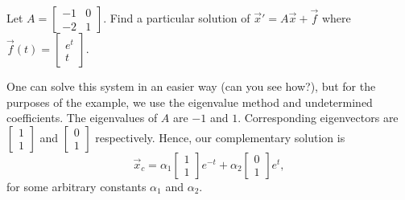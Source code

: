 \begin{example}
Let $A = \left[
\begin{smallmatrix}
-1 & 0 \\
-2 & 1
\end{smallmatrix} \right]$.
Find a particular solution of ${\vec{x}}' = A \vec{x} +
\vec{f}$ where $\vec{f}(t) = 
\left[ \begin{smallmatrix}
e^t \\
t
\end{smallmatrix} \right]$.

One can solve this system in an easier way (can you see how?), but
for the purposes of the example, we use the eigenvalue method and
undetermined coefficients.
The eigenvalues of $A$ are 
$-1$ and $1$.
Corresponding eigenvectors are
$\left[ \begin{smallmatrix}
1 \\
1
\end{smallmatrix} \right]$ and
$\left[ \begin{smallmatrix}
0 \\
1
\end{smallmatrix} \right]$ respectively.
Hence, our complementary solution is
\begin{equation*}
\vec{x}_c = 
\alpha_1
\begin{bmatrix}
1 \\ 1
\end{bmatrix}
e^{-t}
+
\alpha_2
\begin{bmatrix}
0 \\ 1
\end{bmatrix}
e^{t} ,
\end{equation*}
for some arbitrary constants $\alpha_1$ and $\alpha_2$.


\end{example}
